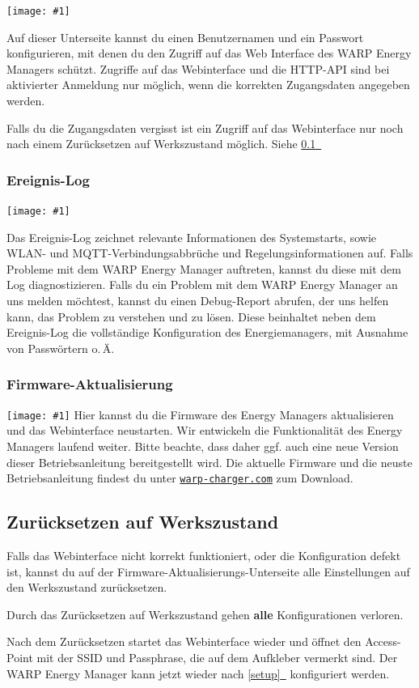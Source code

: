 \documentclass[a4paper,10pt]{article}
\newcommand{\hint}[1]{\begin{tcolorbox}[colback=boxgray,colframe=black,coltext=
white,title=Hinweis,left*=2mm,right*=2mm,boxsep=1mm,bottom=1mm,top=1mm]#1\end{tcolorbox}}
\newcommand{\gfx}[1]{\texttt{[image: \#1]}}
\newcommand*{\fullref}[1]{\hyperref[{#1}]{\ref*{#1}~\nameref*{#1}}}
\newcommand\rurl[2]{%
  \href{#1}{\nolinkurl{#2}}%
}
\begin{document}
\begin{multicols*}{2}
	\gfx{./img/resized/web_authentication.png}

	Auf dieser Unterseite kannst du einen Benutzernamen und ein Passwort konfigurieren, mit denen du den Zugriff auf das Web Interface
	des WARP Energy Managers schützt. Zugriffe auf das Webinterface und die HTTP-API sind bei aktivierter Anmeldung nur möglich, wenn
	die korrekten Zugangsdaten angegeben werden.
	\hint{Falls du die Zugangsdaten vergisst ist ein Zugriff auf das Webinterface nur noch nach einem Zurücksetzen auf Werkszustand möglich. Siehe \fullref{reset}}

	\subsubsection{Ereignis-Log}
	\gfx{./img/resized/web_event_log}

	Das Ereignis-Log zeichnet relevante Informationen des Systemstarts, sowie WLAN- und MQTT-Verbindungsabbrüche und Regelungsinformationen auf.
	Falls Probleme mit dem WARP Energy Manager auftreten, kannst du diese mit dem Log diagnostizieren.
	Falls du ein Problem mit dem WARP Energy Manager an uns melden möchtest, kannst du einen Debug-Report abrufen,
	der uns helfen kann, das Problem zu verstehen und zu lösen. Diese beinhaltet neben dem Ereignis-Log die vollständige
	Konfiguration des Energiemanagers, mit Ausnahme von Passwörtern o.\,Ä.

	\subsubsection{Firmware-Aktualisierung}
	\label{firmware-update}
	\gfx{./img/resized/web_firmware_update}
	Hier kannst du die Firmware des Energy Managers aktualisieren und das Webinterface neustarten.
	Wir entwickeln die Funktionalität
	des Energy Managers laufend weiter. Bitte beachte, dass daher ggf. auch eine neue
	Version dieser Betriebsanleitung bereitgestellt wird.
	Die aktuelle Firmware und die neuste Betriebsanleitung findest du unter
	\rurl{https://warp-charger.com}{warp-charger.com} zum Download.

	\subsection{Zurücksetzen auf Werkszustand}\label{reset}
	Falls das Webinterface nicht korrekt funktioniert, oder die Konfiguration defekt ist,
	kannst du auf der Firmware-Aktualisierungs-Unterseite alle Einstellungen auf den Werkszustand zurücksetzen.
	\hint{Durch das Zurücksetzen auf Werkszustand gehen \mbox{\textbf{alle}} Konfigurationen verloren.}
	Nach dem Zurücksetzen startet das Webinterface wieder und öffnet
	den Access-Point mit der SSID und Passphrase, die auf dem Aufkleber vermerkt
	sind. Der WARP Energy Manager kann jetzt wieder nach \fullref{setup} konfiguriert werden.


\end{multicols*}
\end{document}
